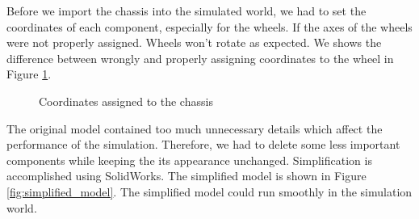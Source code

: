 Before we import the chassis into the simulated world, we had to set the coordinates of each component, especially for the wheels. If the axes of the wheels were not properly assigned. Wheels won't rotate as expected. We shows the difference between wrongly and properly assigning coordinates to the wheel in Figure \ref{fig:coordinates}.

\begin{figure}[htbp]
    \centering
    \caption{Coordinates assigned to the chassis}
    \label{fig:coordinates}
\end{figure}

The original model contained too much unnecessary details which affect the performance of the simulation. Therefore, we had to delete some less important components while keeping the its appearance unchanged. Simplification is accomplished using SolidWorks. The simplified model is shown in Figure \ref{fig:simplified_model}. The simplified model could run smoothly in the simulation world.

